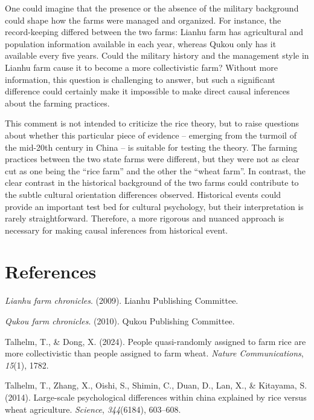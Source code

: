 \documentclass[
  man]{apa6}
\newlength{\cslhangindent}
\newlength{\cslentryspacingunit} %
\newenvironment{CSLReferences}[2] %
 {%
  \setlength{\parindent}{0pt}
  \ifodd #1
  \let\oldpar\par
  \def\par{\hangindent=\cslhangindent\oldpar}
  \fi
  \setlength{\parskip}{#2\cslentryspacingunit}
 }%
 {}
\begin{document}
One could imagine that the presence or the absence of the military background could shape how the farms were managed and organized. For instance, the record-keeping differed between the two farms: Lianhu farm has agricultural and population information available in each year, whereas Qukou only has it available every five years. Could the military history and the management style in Lianhu farm cause it to become a more collectivistic farm? Without more information, this question is challenging to answer, but such a significant difference could certainly make it impossible to make direct causal inferences about the farming practices.

This comment is not intended to criticize the rice theory, but to raise questions about whether this particular piece of evidence -- emerging from the turmoil of the mid-20th century in China -- is suitable for testing the theory. The farming practices between the two state farms were different, but they were not as clear cut as one being the ``rice farm'' and the other the ``wheat farm''. In contrast, the clear contrast in the historical background of the two farms could contribute to the subtle cultural orientation differences observed. Historical events could provide an important test bed for cultural psychology, but their interpretation is rarely straightforward. Therefore, a more rigorous and nuanced approach is necessary for making causal inferences from historical event.

\newpage

\hypertarget{references}{%
\section{References}\label{references}}

\hypertarget{refs}{}
\begin{CSLReferences}{1}{0}
\leavevmode{}%
\emph{Lianhu farm chronicles}. (2009). Lianhu Publishing Committee.

\leavevmode{}%
\emph{Qukou farm chronicles}. (2010). Qukou Publishing Committee.

\leavevmode{}%
Talhelm, T., \& Dong, X. (2024). People quasi-randomly assigned to farm rice are more collectivistic than people assigned to farm wheat. \emph{Nature Communications}, \emph{15}(1), 1782.

\leavevmode{}%
Talhelm, T., Zhang, X., Oishi, S., Shimin, C., Duan, D., Lan, X., \& Kitayama, S. (2014). Large-scale psychological differences within china explained by rice versus wheat agriculture. \emph{Science}, \emph{344}(6184), 603--608.

\end{CSLReferences}
\end{document}

